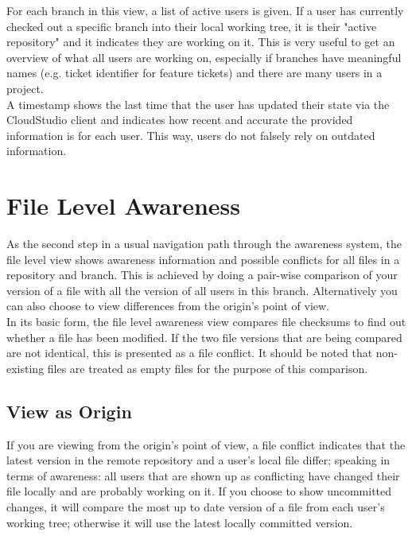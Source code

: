 For each branch in this view, a list of active users is given. If a user has currently checked out a specific branch into their local working tree, it is their "active repository" and it indicates they are working on it. This is very useful to get an overview of what all users are working on, especially if branches have meaningful names (e.g. ticket identifier for feature tickets) and there are many users in a project. \\

A timestamp shows the last time that the user has updated their state via the CloudStudio client and indicates how recent and accurate the provided information is for each user. This way, users do not falsely rely on outdated information.






\section{File Level Awareness}

As the second step in a usual navigation path through the awareness system, the file level view shows awareness information and possible conflicts for all files in a repository and branch. This is achieved by doing a pair-wise comparison of your version of a file with all the version of all users in this branch. Alternatively you can also choose to view differences from the origin's point of view. \\

In its basic form, the file level awareness view compares file checksums to find out whether a file has been modified. If the two file versions that are being compared are not identical, this is presented as a file conflict. It should be noted that non-existing files are treated as empty files for the purpose of this comparison.


\subsection{View as Origin}

If you are viewing from the origin's point of view, a file conflict indicates that the latest version in the remote repository and a user's local file differ; speaking in terms of awareness: all users that are shown up as conflicting have changed their file locally and are probably working on it. If you choose to show uncommitted changes, it will compare the most up to date version of a file from each user's working tree; otherwise it will use the latest locally committed version. \\

